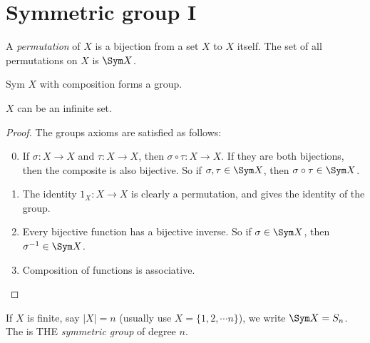 \documentclass[a4paper]{article}
\begin{document}
  \section{Symmetric group I}
  \begin{defi}[Permutation]
    A \emph{permutation} of $X$ is a bijection from a set $X$ to $X$ itself. The set of all permutations on $X$ is $\Sym X$.
  \end{defi}

  \begin{thm}
    Sym $X$ with composition forms a group.
  \end{thm}
  \note $X$ can be an infinite set.

  \begin{proof}
    The groups axioms are satisfied as follows:
    \begin{enumerate}[label=\arabic{*}.]
        \setcounter{enumi}{-1}
      \item If $\sigma: X\to X$ and $\tau: X\to X$, then $\sigma\circ\tau:X\to X$. If they are both bijections, then the composite is also bijective. So if $\sigma, \tau\in \Sym X$, then $\sigma\circ\tau\in\Sym X$.
      \item The identity $1_X:X\to X$ is clearly a permutation, and gives the identity of the group.
      \item Every bijective function has a bijective inverse. So if $\sigma\in \Sym X$, then $\sigma^{-1} \in \Sym X$.
      \item Composition of functions is associative.
    \end{enumerate}
  \end{proof}
  \begin{defi}
    If $X$ is finite, say $|X| = n$ (usually use $X = \{1, 2, \cdots n\}$), we write $\Sym X = S_n$. The is THE \emph{symmetric group} of degree $n$.
  \end{defi}
\end{document}
